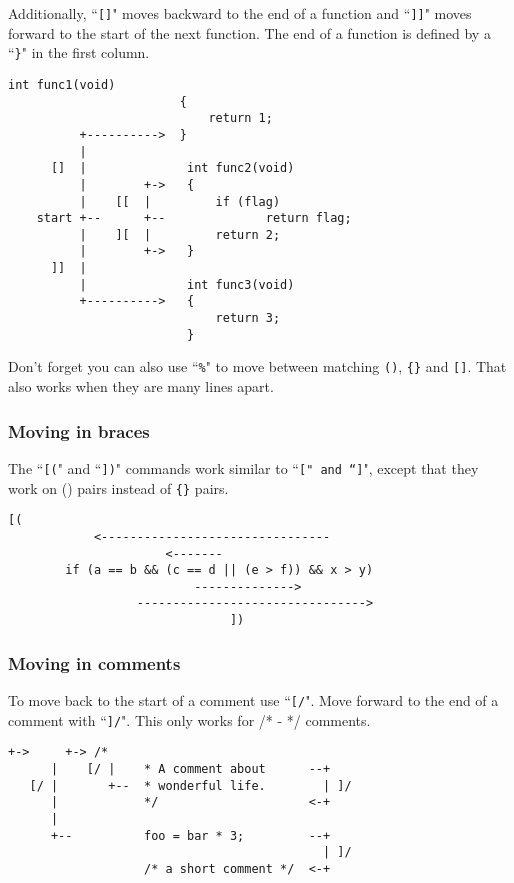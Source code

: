 Additionally, ``\texttt{[]}" moves backward to the end of a function and ``\texttt{]]}" moves forward to the start of the next function.
The end of a function is defined by a ``\texttt{\}}" in the first column.

\begin{Verbatim}[samepage=true]
                        int func1(void)
                        {
                            return 1;
          +---------->  }
          |
      []  |              int func2(void)
          |        +->   {
          |    [[  |         if (flag)
    start +--      +--              return flag;
          |    ][  |         return 2;
          |        +->   }
      ]]  |
          |              int func3(void)
          +---------->   {
                             return 3;
                         }
\end{Verbatim}

Don't forget you can also use ``\texttt{\%}" to move between matching \texttt{()}, \texttt{\{\}} and \texttt{[]}.
That also works when they are many lines apart.
\subsubsection{Moving in braces}
The ``\texttt{[(}" and ``\texttt{])}" commands work similar to ``\texttt{[{}" and ``\texttt{]}}", except that they work on () pairs instead of \texttt{\{\}} pairs.

\begin{Verbatim}[samepage=true]
                          [(
            <--------------------------------
                      <-------
        if (a == b && (c == d || (e > f)) && x > y) 
                          -------------->
                  -------------------------------->
                               ])
\end{Verbatim}

\subsubsection{Moving in comments}
To move back to the start of a comment use ``\texttt{[/}".
Move forward to the end of a comment with ``\texttt{]/}".
This only works for /* - */ comments.

\begin{Verbatim}[samepage=true]
      +->     +-> /*
      |    [/ |    * A comment about      --+
   [/ |       +--  * wonderful life.        | ]/
      |            */                     <-+
      |
      +--          foo = bar * 3;         --+
                                            | ]/
                   /* a short comment */  <-+
\end{Verbatim}
